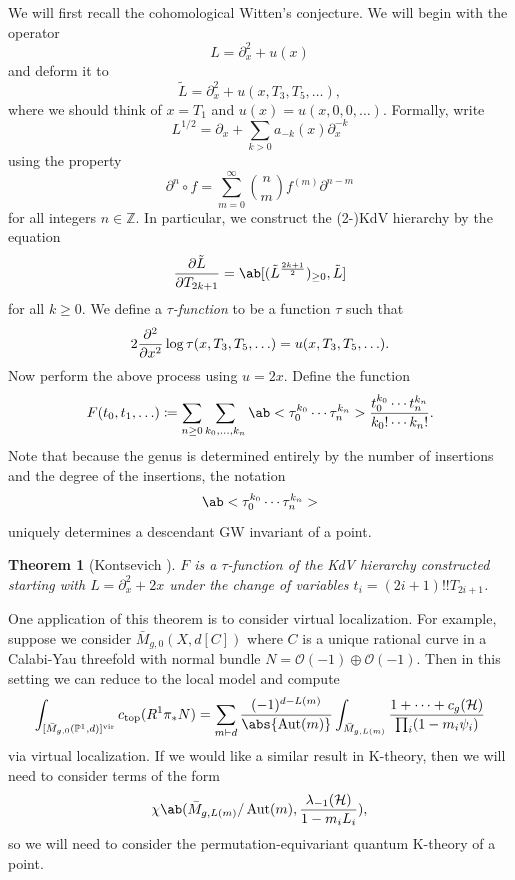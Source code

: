 \documentclass{amsart}
\newtheorem{thm}{Theorem}[section]
\theoremstyle{definition}
\theoremstyle{remark}
\theoremstyle{plain}
\theoremstyle{definition}
\theoremstyle{remark}
\newcommand{\Z}{\mathbb{Z}}
\renewcommand{\P}{\mathbb{P}}
\newcommand{\mc}[1]{\mathcal{#1}}
\newcommand{\mr}[1]{\mathrm{#1}}
\newcommand{\1}{\mathbf{1}}
\newcommand{\2}{\mathbf{2}}
\newcommand{\3}{\mathbf{3}}
\newcommand{\vir}{\mr{vir}}
\DeclareMathOperator{\Aut}{Aut}
\begin{document}
We will first recall the cohomological Witten's conjecture. We will begin with the operator
\[ L = \partial_x^2 + u(x) \]
and deform it to
\[ \tilde{L} = \partial_x^2 + u(x, T_3, T_5, \ldots), \]
where we should think of \(x = T_1\) and \(u(x) = u(x, 0, 0,\ldots)\). Formally, write
\[ L^{1/2} = \partial_x + \sum_{k > 0} a_{-k}(x) \partial_x^{-k} \]
using the property
\[ \partial^n \circ f = \sum_{m = 0}^{\infty} \binom{n}{m} f^{(m)} \partial^{n-m} \]
for all integers \(n \in \Z\). In particular, we construct the (2-)KdV hierarchy by the equation
\[ \pdv{\tilde{L}}{T_{2k+1}} = \ab[(\tilde{L}^{\frac{2k+1}{2}})_{\geq 0}, \tilde{L}] \]
for all \(k \geq 0\). We define a \textit{\(\tau\)-function} to be a function \(\tau\) such that 
\[ 2 \pdv[2]{}{x}\log \tau(x, T_3, T_5, \ldots) = u(x, T_3, T_5, \ldots). \]
Now perform the above process using \(u = 2x\). Define the function
\[ F(t_0, t_1, \ldots) \coloneqq \sum_{n \geq 0} \sum_{k_0, \ldots, k_n} \ab<\tau_0^{k_0} \cdots \tau_n^{k_n}> \frac{t_0^{k_0} \cdots t_n^{k_n}}{k_0! \cdots k_n!}. \]
Note that because the genus is determined entirely by the number of insertions and the degree of the insertions, the notation
\[ \ab<\tau_0^{k_0} \cdots \tau_n^{k_n}> \]
uniquely determines a descendant GW invariant of a point.

\begin{thm}[Kontsevich {\cite{Kontsevich1992}}]
    \(F\) is a \(\tau\)-function of the KdV hierarchy constructed starting with \(L = \partial_x^2 + 2x\) under the change of variables \(t_i = (2i+1)!! T_{2i+1}\).
\end{thm}

One application of this theorem is to consider virtual localization. For example, suppose we consider \(\bar{M}_{g,0}(X, d[C])\) where \(C\) is a unique rational curve in a Calabi-Yau threefold with normal bundle \(N = \mc{O}(-1)\oplus \mc{O}(-1)\). Then in this setting we can reduce to the local model and compute
\begin{align*}
    \int_{[\bar{M}_{g,0}(\P^1, d)]^{\vir}} c_{\mr{top}}(R^1 \pi_* N) = \sum_{m \vdash d} \frac{(-1)^{d-L(m)}}{\abs{\Aut(m)}} \int_{\bar{M}_{g, L(m)}} \frac{1 + \cdots + c_g(\mc{H})}{\prod_i (1-m_i \psi_i)}
\end{align*}
via virtual localization. If we would like a similar result in K-theory, then we will need to consider terms of the form
\[ \chi\ab(\bar{M}_{g, L(m)}/\Aut(m), \frac{\lambda_{-1}(\mc{H})}{1-m_i L_i}), \]
so we will need to consider the permutation-equivariant quantum K-theory of a point.
\end{document}
